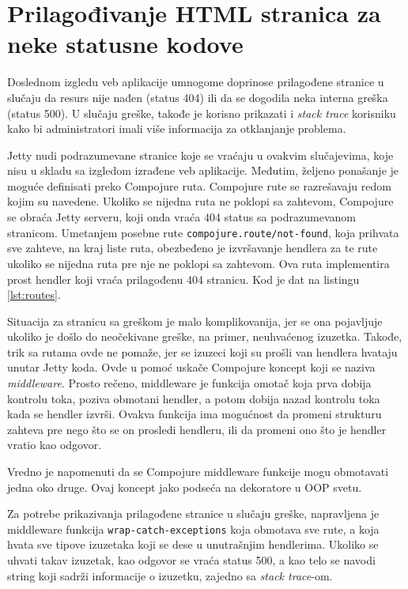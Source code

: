 {\section{Prilagođivanje HTML stranica za neke statusne kodove}
Doslednom izgledu veb aplikacije umnogome doprinose prilagođene stranice u slučaju da resurs nije nađen (status 404) ili da se dogodila neka interna greška (status 500). U slučaju greške, takođe je korisno prikazati i \textit{stack trace} korisniku kako bi administratori imali više informacija za otklanjanje problema.


Jetty nudi podrazumevane stranice koje se vraćaju u ovakvim slučajevima, koje nisu u skladu sa izgledom izrađene veb aplikacije. Međutim, željeno ponašanje je moguće definisati preko Compojure ruta. Compojure rute se razrešavaju redom kojim su navedene. Ukoliko se nijedna ruta ne poklopi sa zahtevom, Compojure se obraća Jetty serveru, koji onda vraća 404 status sa podrazumevanom stranicom. Umetanjem posebne rute \texttt{compojure.route/not-found}, koja prihvata sve zahteve, na kraj liste ruta, obezbeđeno je izvršavanje hendlera za te rute ukoliko se nijedna ruta pre nje ne poklopi sa zahtevom. Ova ruta implementira prost hendler koji vraća prilagođenu 404 stranicu. Kod je dat na listingu \ref{lst:routes}.


Situacija za stranicu sa greškom je malo komplikovanija, jer se ona pojavljuje ukoliko je došlo do neočekivane greške, na primer, neuhvaćenog izuzetka. Takođe, trik sa rutama ovde ne pomaže, jer se izuzeci koji su prošli van hendlera hvataju unutar Jetty koda. Ovde u pomoć uskače Compojure koncept koji se naziva \textit{middleware}. Prosto rečeno, middleware je funkcija omotač koja prva dobija kontrolu toka, poziva obmotani hendler, a potom dobija nazad kontrolu toka kada se hendler izvrši. Ovakva funkcija ima mogućnost da promeni strukturu zahteva pre nego što se on prosledi hendleru, ili da promeni ono što je hendler vratio kao odgovor.

Vredno je napomenuti da se Compojure middleware funkcije mogu obmotavati jedna oko druge. Ovaj koncept jako podseća na dekoratore u OOP svetu.

Za potrebe prikazivanja prilagođene stranice u slučaju greške, napravljena je middleware funkcija \texttt{wrap-catch-exceptions} koja obmotava sve rute, a koja hvata sve tipove izuzetaka koji se dese u unutrašnjim hendlerima. Ukoliko se uhvati takav izuzetak, kao odgovor se vraća status 500, a kao telo se navodi string koji sadrži informacije o izuzetku, zajedno sa \textit{stack trace}-om.

}
